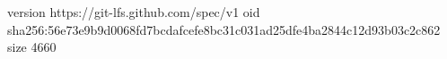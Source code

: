 version https://git-lfs.github.com/spec/v1
oid sha256:56e73e9b9d0068fd7bcdafcefe8bc31c031ad25dfe4ba2844c12d93b03c2c862
size 4660
